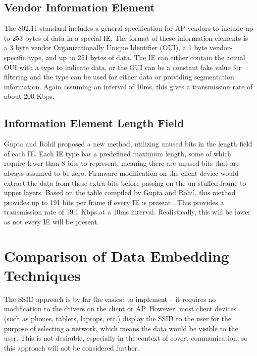 \documentclass[letterpaper, 10 pt, conference]{ieeeconf}  %
\begin{document}
\subsection{Vendor Information Element}

The 802.11 standard includes a general specification for AP vendors to include up to 253 bytes of data in a special IE.  The format of these information elements is a 3 byte vendor Organizationally Unique Identifier (OUI), a 1 byte vendor-specific type, and up to 251 bytes of data. The IE can either contain the actual OUI with a type to indicate data, or the OUI can be a constant fake value for filtering and the type can be used for either data or providing segmentation information.  Again assuming an interval of 10ms, this gives a transmission rate of about 200 Kbps.

\subsection{Information Element Length Field}

Gupta and Rohil proposed a new method, utilizing unused bits in the length field of each IE. Each IE type has a predefined maximum length, some of which require fewer than 8 bits to represent, meaning there are unused bits that are always assumed to be zero.  Firmware modification on the client device would extract the data from these extra bits before passing on the un-stuffed frame to upper layers. Based on the table compiled by Gupta and Rohil, this method provides up to 191 bits per frame if every IE is present \cite{c2}. This provides a transmission rate of 19.1 Kbps at a 10ms interval.  Realistically, this will be lower as not every IE will be present.


\section{Comparison of Data Embedding Techniques}

The SSID approach is by far the easiest to implement -- it requires no modification to the drivers on the client or AP. However, most client devices (such as phones, tablets, laptops, etc.) display the SSID to the user for the purpose of selecting a network, which means the data would be visible to the user.  This is not desirable, especially in the context of covert communication, so this approach will not be considered further.
\end{document}
